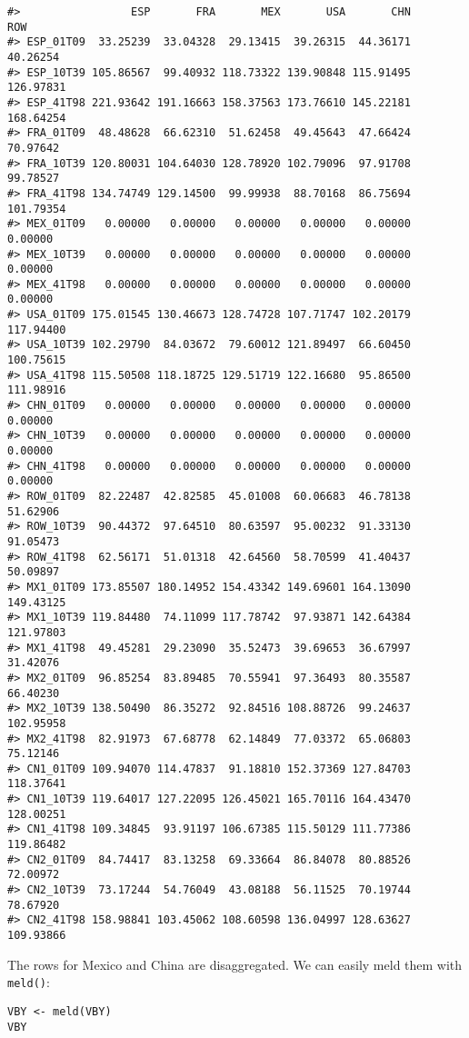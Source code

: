 \begin{verbatim}
#>                 ESP       FRA       MEX       USA       CHN       ROW
#> ESP_01T09  33.25239  33.04328  29.13415  39.26315  44.36171  40.26254
#> ESP_10T39 105.86567  99.40932 118.73322 139.90848 115.91495 126.97831
#> ESP_41T98 221.93642 191.16663 158.37563 173.76610 145.22181 168.64254
#> FRA_01T09  48.48628  66.62310  51.62458  49.45643  47.66424  70.97642
#> FRA_10T39 120.80031 104.64030 128.78920 102.79096  97.91708  99.78527
#> FRA_41T98 134.74749 129.14500  99.99938  88.70168  86.75694 101.79354
#> MEX_01T09   0.00000   0.00000   0.00000   0.00000   0.00000   0.00000
#> MEX_10T39   0.00000   0.00000   0.00000   0.00000   0.00000   0.00000
#> MEX_41T98   0.00000   0.00000   0.00000   0.00000   0.00000   0.00000
#> USA_01T09 175.01545 130.46673 128.74728 107.71747 102.20179 117.94400
#> USA_10T39 102.29790  84.03672  79.60012 121.89497  66.60450 100.75615
#> USA_41T98 115.50508 118.18725 129.51719 122.16680  95.86500 111.98916
#> CHN_01T09   0.00000   0.00000   0.00000   0.00000   0.00000   0.00000
#> CHN_10T39   0.00000   0.00000   0.00000   0.00000   0.00000   0.00000
#> CHN_41T98   0.00000   0.00000   0.00000   0.00000   0.00000   0.00000
#> ROW_01T09  82.22487  42.82585  45.01008  60.06683  46.78138  51.62906
#> ROW_10T39  90.44372  97.64510  80.63597  95.00232  91.33130  91.05473
#> ROW_41T98  62.56171  51.01318  42.64560  58.70599  41.40437  50.09897
#> MX1_01T09 173.85507 180.14952 154.43342 149.69601 164.13090 149.43125
#> MX1_10T39 119.84480  74.11099 117.78742  97.93871 142.64384 121.97803
#> MX1_41T98  49.45281  29.23090  35.52473  39.69653  36.67997  31.42076
#> MX2_01T09  96.85254  83.89485  70.55941  97.36493  80.35587  66.40230
#> MX2_10T39 138.50490  86.35272  92.84516 108.88726  99.24637 102.95958
#> MX2_41T98  82.91973  67.68778  62.14849  77.03372  65.06803  75.12146
#> CN1_01T09 109.94070 114.47837  91.18810 152.37369 127.84703 118.37641
#> CN1_10T39 119.64017 127.22095 126.45021 165.70116 164.43470 128.00251
#> CN1_41T98 109.34845  93.91197 106.67385 115.50129 111.77386 119.86482
#> CN2_01T09  84.74417  83.13258  69.33664  86.84078  80.88526  72.00972
#> CN2_10T39  73.17244  54.76049  43.08188  56.11525  70.19744  78.67920
#> CN2_41T98 158.98841 103.45062 108.60598 136.04997 128.63627 109.93866
\end{verbatim}

The rows for Mexico and China are disaggregated. We can easily meld
them with \texttt{meld()}:

\begin{verbatim}
VBY <- meld(VBY)
VBY
\end{verbatim}

